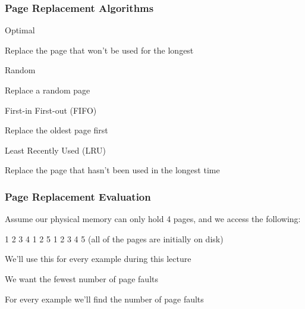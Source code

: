   \begin{frame}
    \frametitle{Page Replacement Algorithms}

    Optimal

    \hspace{2em} Replace the page that won't be used for the longest

    \vspace{2em}

    Random

    \hspace{2em} Replace a random page

    \vspace{2em}

    First-in First-out (FIFO)

    \hspace{2em} Replace the oldest page first
    
    \vspace{2em}

    Least Recently Used (LRU)

    \hspace{2em} Replace the page that hasn't been used in the longest time
  \end{frame}

  \begin{frame}
    \frametitle{Page Replacement Evaluation}

    Assume our physical memory can only hold 4 pages, and we access the following:

    \hspace{2em} 1 2 3 4 1 2 5 1 2 3 4 5 (all of the pages are initially on disk)

    \vspace{2em}

    We'll use this for every example during this lecture

    \hspace{2em} We want the fewest number of page faults

    \vspace{2em}

    For every example we'll find the number of page faults
  \end{frame}

